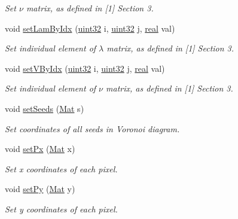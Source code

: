 \begin{DoxyCompactItemize}
\begin{DoxyCompactList}\small\item\em Set $\nu$ matrix, as defined in \mbox{[}1\mbox{]} Section 3. \end{DoxyCompactList}\item 
void \mbox{\hyperlink{classvd_a8df228a05762e0c0a2bccc28094a1f92}{set\+Lam\+By\+Idx}} (\mbox{\hyperlink{typedefs_8h_a8ad23e2333787a214e20a58a284a5a60}{uint32}} i, \mbox{\hyperlink{typedefs_8h_a8ad23e2333787a214e20a58a284a5a60}{uint32}} j, \mbox{\hyperlink{typedefs_8h_a58a0c7cf2501f4492da833421be92547}{real}} val)
\begin{DoxyCompactList}\small\item\em Set individual element of $\lambda$ matrix, as defined in \mbox{[}1\mbox{]} Section 3. \end{DoxyCompactList}\item 
void \mbox{\hyperlink{classvd_a29670919bb8d5b2f2f0235ddfda6484e}{set\+V\+By\+Idx}} (\mbox{\hyperlink{typedefs_8h_a8ad23e2333787a214e20a58a284a5a60}{uint32}} i, \mbox{\hyperlink{typedefs_8h_a8ad23e2333787a214e20a58a284a5a60}{uint32}} j, \mbox{\hyperlink{typedefs_8h_a58a0c7cf2501f4492da833421be92547}{real}} val)
\begin{DoxyCompactList}\small\item\em Set individual element of $\nu$ matrix, as defined in \mbox{[}1\mbox{]} Section 3. \end{DoxyCompactList}\item 
void \mbox{\hyperlink{classvd_a739318bbb45d4facfcc1899c71b91720}{set\+Seeds}} (\mbox{\hyperlink{typedefs_8h_a9fa28c1f74e909474857584f5c7b0088}{Mat}} s)
\begin{DoxyCompactList}\small\item\em Set coordinates of all seeds in Voronoi diagram. \end{DoxyCompactList}\item 
void \mbox{\hyperlink{classvd_a579df0c885a43bb876449889bbcba6cb}{set\+Px}} (\mbox{\hyperlink{typedefs_8h_a9fa28c1f74e909474857584f5c7b0088}{Mat}} x)
\begin{DoxyCompactList}\small\item\em Set x coordinates of each pixel. \end{DoxyCompactList}\item 
void \mbox{\hyperlink{classvd_a8314de29eacf72f10afee2c67b0c9819}{set\+Py}} (\mbox{\hyperlink{typedefs_8h_a9fa28c1f74e909474857584f5c7b0088}{Mat}} y)
\begin{DoxyCompactList}\small\item\em Set y coordinates of each pixel. \end{DoxyCompactList}\item 

\end{DoxyCompactItemize}
